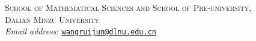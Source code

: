 \documentclass[11pt]{article}
\numberwithin{equation}{section}
\theoremstyle{definition}
\begin{document}
\endgroup
\noindent\begin{minipage}{\textwidth}
\small
\textsc{School of Mathematical Sciences and School of Pre-university,}\\
\textsc{Dalian Minzu University}\\[0.4em]
\textit{Email address:}\enspace
\href{mailto:wangruijun@dlnu.edu.cn}{\texttt{wangruijun@dlnu.edu.cn}}
\end{minipage}
\end{document}
